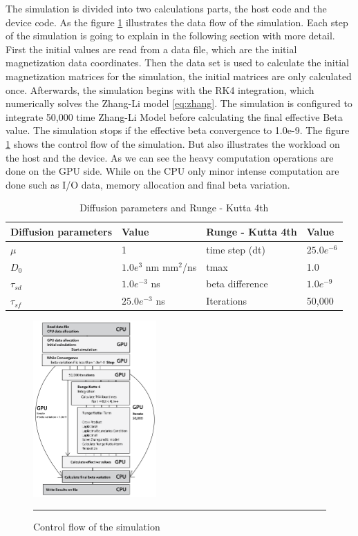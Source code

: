 The simulation is divided into two calculations parts, the host code and the device code. As the figure \ref{fig:flow} illustrates the data flow of the simulation. Each step of the simulation is going to explain in the following section with more detail. First the initial values are read from a data file, which are the initial magnetization data coordinates. Then the data set is used to calculate the initial magnetization matrices for the simulation, the initial matrices are only calculated once. Afterwards, the simulation begins with the RK4 integration, which numerically solves the  Zhang-Li model \ref{eq:zhang}. The simulation is configured to integrate 50,000 time Zhang-Li Model before calculating the final effective Beta value. The simulation stops if the effective beta  convergence to 1.0e-9. The figure \ref{fig:flow} shows the control flow of the simulation. But also illustrates the workload on the host and the device. As we can see the heavy computation operations are done on the GPU side. While on the CPU only minor intense computation are done such as I/O data, memory allocation and final beta variation.

\begin{table}[h]
\centering
\begin{tabular}{| l | l | l | l |}
\hline
Diffusion parameters& Value & Runge - Kutta 4th & Value \\
\hline 
$\mu$ & 1 &  time step (dt) &   $25.0e^{-6}$   \\
\hline
$D_{0}$ & $1.0e^{3}$ nm mm$^2$/ns  & tmax  & 1.0  \\
\hline
$\tau_{sd}$ & $1.0e^{-3}$ ns  & beta difference & $1.0e^{-9}$ \\
\hline
$\tau_{sf}$ & $25.0e^{-3}$ ns  & Iterations & 50,000 \\
\hline
\end{tabular}
\caption{Diffusion parameters and Runge - Kutta 4th}
\label{tab:drk}
\end{table}

\begin{figure}[htbp]
	\centering
		\includegraphics[width=0.42\textwidth]{Figures/flow.png}
		\rule{35em}{0.2pt}
	\caption[Control flow]{Control flow of the simulation}
	\label{fig:flow}
\end{figure}

